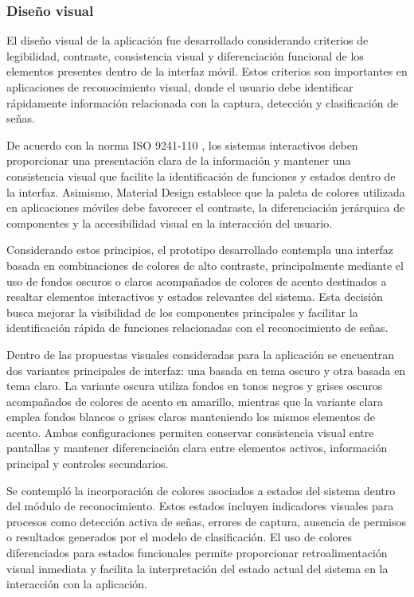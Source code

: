	\subsubsection{Diseño visual}
	
	El diseño visual de la aplicación fue desarrollado considerando criterios de
	legibilidad, contraste, consistencia visual y diferenciación funcional de los
	elementos presentes dentro de la interfaz móvil. Estos criterios son importantes en aplicaciones de reconocimiento visual, donde el
	usuario debe identificar rápidamente información relacionada con la captura,
	detección y clasificación de señas.
	
	De acuerdo con la norma ISO 9241-110 \cite{iso9241}, los sistemas interactivos
	deben proporcionar una presentación clara de la información y mantener una
	consistencia visual que facilite la identificación de funciones y estados dentro
	de la interfaz. Asimismo, Material Design \cite{materialDesign} establece que la
	paleta de colores utilizada en aplicaciones móviles debe favorecer el contraste,
	la diferenciación jerárquica de componentes y la accesibilidad visual en la
	interacción del usuario.
	
	Considerando estos principios, el prototipo desarrollado contempla una interfaz
	basada en combinaciones de colores de alto contraste, principalmente mediante el
	uso de fondos oscuros o claros acompañados de colores de acento destinados a
	resaltar elementos interactivos y estados relevantes del sistema. Esta decisión
	busca mejorar la visibilidad de los componentes principales y facilitar la
	identificación rápida de funciones relacionadas con el reconocimiento de señas.
	
	Dentro de las propuestas visuales consideradas para la aplicación se encuentran
	dos variantes principales de interfaz: una basada en tema oscuro y otra basada en
	tema claro. La variante oscura utiliza fondos en tonos negros y grises oscuros
	acompañados de colores de acento en amarillo, mientras que la variante clara
	emplea fondos blancos o grises claros manteniendo los mismos elementos de acento.
	Ambas configuraciones permiten conservar consistencia visual entre pantallas y
	mantener diferenciación clara entre elementos activos, información principal y
	controles secundarios.
	
	Se contempló la incorporación de colores asociados a estados del
	sistema dentro del módulo de reconocimiento. Estos estados incluyen indicadores
	visuales para procesos como detección activa de señas, errores de captura,
	ausencia de permisos o resultados generados por el modelo de clasificación. El
	uso de colores diferenciados para estados funcionales permite proporcionar
	retroalimentación visual inmediata y facilita la interpretación del estado actual
	del sistema en la interacción con la aplicación.
	
